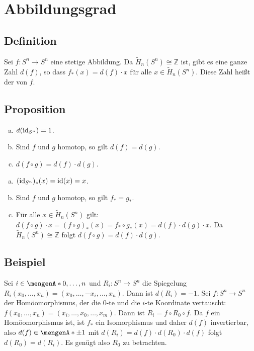 \section*{Abbildungsgrad}

\subsection[Definition: Abbildungsgrad einer stetigen Abbildung $f \colon S^n \to S^n$]{Definition} %
\label{sub:103}
Sei $f \colon S^n \to S^n$ eine stetige Abbildung. Da $\tilde{H}_n(S^n) \cong \mathds{Z}$ ist, gibt es eine ganze Zahl $d(f)$, so dass $f_*(x)= d(f) \cdot x$ für alle 
$x \in \tilde{H}_n(S^n)$. Diese Zahl heißt der  von $f$. 

\subsection[Proposition: Einfache Eigenschaften des Abbildungsgrades]{Proposition} %
\label{sub:104}
\begin{enumerate}[a)]
	\item $d(\operatorname{id}_{S^n}) = 1$.
	\item Sind $f$ und $g$ homotop, so gilt $d(f)=d(g)$.
	\item $d(f \circ g) = d(f) \cdot d(g)$.
\end{enumerate}
\begin{enumerate}[a)]
	\item $(\operatorname{id}_{S^n})_*(x)= \operatorname{id}(x)= x$.
	\item Sind $f$ und $g$ homotop, so gilt $f_*=g_*$.
	\item Für alle $x \in \tilde{H}_n(S^n)$ gilt: $d(f \circ g) \cdot x = (f \circ g)_* (x) = f_* \circ g_*(x)= d(f) \cdot d(g) \cdot x$. Da 
	$\tilde{H}_n(S^n) \cong \mathds{Z}$ folgt $d(f \circ g) = d(f) \cdot d(g)$. \bewende
\end{enumerate}

\subsection[Beispiel: Abbildungsgrad der Spiegelung]{Beispiel} %
\label{sub:105}
Sei $i \in \set{0, \ldots ,n}$ und $R_i \colon S^n \to S^n$ die Spiegelung $R_i(x_0, \ldots , x_n) = (x_0, \ldots , - x_i, \ldots , x_n)$. Dann ist $d(R_i) = -1$.
Sei $f : S^n \to S^n$ der Homöomorphismus, der die $0$-te und die $i$-te Koordinate vertauscht: $f(x_0, \ldots , x_n) = (x_i, \ldots , x_0, \ldots , x_m)$. Dann ist
$R_i = f \circ R_0 \circ f$. Da $f$ ein Homöomorphismus ist, ist $f_*$ ein Isomorphismus und daher $d(f)$ invertierbar, also $d(f) \in \set{\pm 1}$ mit 
$d(R_i) = d(f) \cdot d(R_0) \cdot d(f)$ folgt $d(R_0)=d(R_i)$. Es genügt also $R_0$ zu betrachten.

